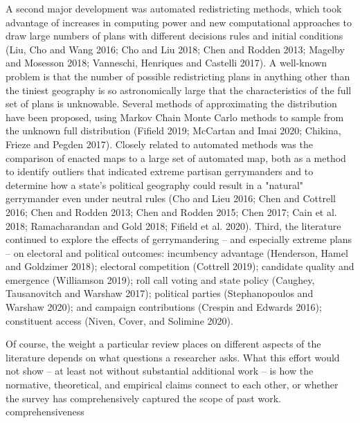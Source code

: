 \documentclass{cup-pan}
\begin{document}
A second major development was automated redistricting methods, which took advantage of increases in computing power and new computational approaches to draw large numbers of plans with different decisions rules and initial conditions (Liu, Cho and Wang 2016; Cho and Liu 2018; Chen and Rodden 2013; Magelby and Mosesson 2018; Vanneschi, Henriques and Castelli 2017). A well-known problem is that the number of possible redistricting plans in anything other than the tiniest geography is so astronomically large that the characteristics of the full set of plans is unknowable. Several methods of approximating the distribution have been proposed, using Markov Chain Monte Carlo methods to sample from the unknown full distribution (Fifield 2019; McCartan and Imai 2020; Chikina, Frieze and Pegden 2017). Closely related to automated methods was the comparison of enacted maps to a large set of automated map, both as a method to identify outliers that indicated extreme partisan gerrymanders and to determine how a state's political geography could result in a "natural" gerrymander even under neutral rules (Cho and Lieu 2016; Chen and Cottrell 2016; Chen and Rodden 2013; Chen and Rodden 2015; Chen 2017; Cain et al. 2018; Ramacharandan and Gold 2018; Fifield et al. 2020).
Third, the literature continued to explore the effects of gerrymandering – and especially extreme plans – on electoral and political outcomes: incumbency advantage (Henderson, Hamel and Goldzimer 2018); electoral competition (Cottrell 2019); candidate quality and emergence (Williamson 2019); roll call voting and state policy (Caughey, Tausanovitch and Warshaw 2017); political parties (Stephanopoulos and Warshaw 2020); and campaign contributions (Crespin and Edwards 2016); constituent access (Niven, Cover, and Solimine 2020).

Of course, the weight a particular review places on different aspects of the literature depends on what questions a researcher asks. What this effort would not show – at least not without substantial additional work – is how the normative, theoretical, and empirical claims connect to each other, or whether the survey has comprehensively captured the scope of past work. comprehensiveness
  
\end{document}
